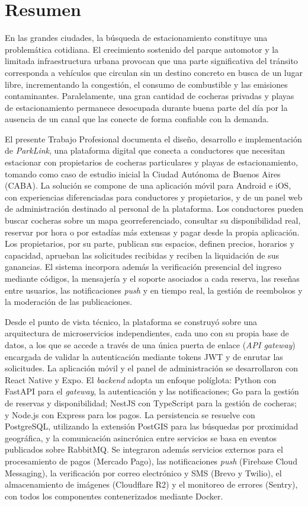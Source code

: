 \section{Resumen}
En las grandes ciudades, la búsqueda de estacionamiento constituye una problemática cotidiana. El crecimiento sostenido del parque automotor y la limitada infraestructura urbana provocan que una parte significativa del tránsito corresponda a vehículos que circulan sin un destino concreto en busca de un lugar libre, incrementando la congestión, el consumo de combustible y las emisiones contaminantes. Paralelamente, una gran cantidad de cocheras privadas y playas de estacionamiento permanece desocupada durante buena parte del día por la ausencia de un canal que las conecte de forma confiable con la demanda.

El presente Trabajo Profesional documenta el diseño, desarrollo e implementación de \textit{ParkLink}, una plataforma digital que conecta a conductores que necesitan estacionar con propietarios de cocheras particulares y playas de estacionamiento, tomando como caso de estudio inicial la Ciudad Autónoma de Buenos Aires (CABA). La solución se compone de una aplicación móvil para Android e iOS, con experiencias diferenciadas para conductores y propietarios, y de un panel web de administración destinado al personal de la plataforma. Los conductores pueden buscar cocheras sobre un mapa georreferenciado, consultar su disponibilidad real, reservar por hora o por estadías más extensas y pagar desde la propia aplicación. Los propietarios, por su parte, publican sus espacios, definen precios, horarios y capacidad, aprueban las solicitudes recibidas y reciben la liquidación de sus ganancias. El sistema incorpora además la verificación presencial del ingreso mediante códigos, la mensajería y el soporte asociados a cada reserva, las reseñas entre usuarios, las notificaciones \textit{push} y en tiempo real, la gestión de reembolsos y la moderación de las publicaciones.

Desde el punto de vista técnico, la plataforma se construyó sobre una arquitectura de microservicios independientes, cada uno con su propia base de datos, a los que se accede a través de una única puerta de enlace (\textit{API gateway}) encargada de validar la autenticación mediante tokens JWT y de enrutar las solicitudes. La aplicación móvil y el panel de administración se desarrollaron con React Native y Expo. El \textit{backend} adopta un enfoque políglota: Python con FastAPI para el \textit{gateway}, la autenticación y las notificaciones; Go para la gestión de reservas y disponibilidad; NestJS con TypeScript para la gestión de cocheras; y Node.js con Express para los pagos. La persistencia se resuelve con PostgreSQL, utilizando la extensión PostGIS para las búsquedas por proximidad geográfica, y la comunicación asincrónica entre servicios se basa en eventos publicados sobre RabbitMQ. Se integraron además servicios externos para el procesamiento de pagos (Mercado Pago), las notificaciones \textit{push} (Firebase Cloud Messaging), la verificación por correo electrónico y SMS (Brevo y Twilio), el almacenamiento de imágenes (Cloudflare R2) y el monitoreo de errores (Sentry), con todos los componentes contenerizados mediante Docker.

